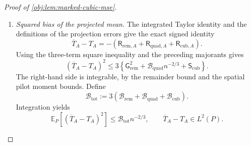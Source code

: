 \begin{proof}[Proof of \cref{obj:lem:marked-cubic-mse}]
\begin{enumerate}
\item \textit{Squared bias of the projected mean.}
The integrated Taylor identity and the definitions of the projection errors give the exact signed identity
\[
\overline T_A-T_A
=
-\left(
\mathsf R_{\mathrm{rem},A}
+\mathsf R_{\mathrm{quad},A}
+\mathsf R_{\mathrm{cub},A}
\right).
\]
Using the three-term square inequality and the preceding majorants gives
\[
(\overline T_A-T_A)^2
\le
3\left\{
\mathsf G_{\mathrm{rem}}^2
+\mathcal B_{\mathrm{quad}}n^{-2/3}
+\mathsf S_{\mathrm{cub}}
\right\}.
\]
The right-hand side is integrable, by the remainder bound and the spatial pilot moment bounds. Define
\[
\mathcal B_{\mathrm{tot}}
:=3\left(
\mathcal B_{\mathrm{rem}}
+\mathcal B_{\mathrm{quad}}
+\mathcal B_{\mathrm{cub}}
\right).
\]
Integration yields
\[
\mathbb E_P[(\overline T_A-T_A)^2]
\le\mathcal B_{\mathrm{tot}}n^{-2/3},
\qquad
\overline T_A-T_A\in L^2(P).
\]


\end{enumerate}
\end{proof}
